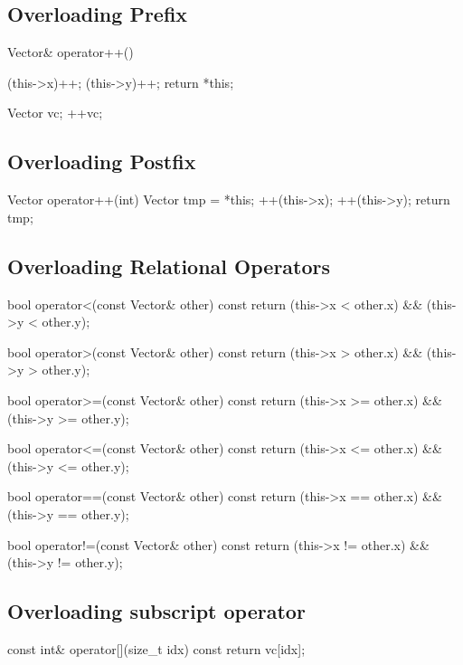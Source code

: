 \documentclass{report}
\begin{document}
    \bigbreak \noindent 
    \subsection{Overloading Prefix}
    \bigbreak \noindent 
    \begin{cppcode}
     Vector& operator++() {
            (this->x)++;
            (this->y)++;
            return *this;

    }
    Vector vc;
    ++vc;
    \end{cppcode}

    \bigbreak \noindent 
    \subsection{Overloading Postfix}
    \bigbreak \noindent 
    \begin{cppcode}
    Vector operator++(int) {
            Vector tmp = *this;
            ++(this->x);
            ++(this->y);
            return  tmp;
    }
    \end{cppcode}
    \bigbreak \noindent 

    \pagebreak
    \subsection{Overloading Relational Operators}
    \bigbreak \noindent 
    \begin{cppcode}
    bool operator<(const Vector& other) const {
        return (this->x < other.x) && (this->y < other.y);
    }

    bool operator>(const Vector& other) const {
        return (this->x > other.x) && (this->y > other.y);
    }

    bool operator>=(const Vector& other) const {
        return (this->x >= other.x) && (this->y >= other.y);
    }

    bool operator<=(const Vector& other) const {
        return (this->x <= other.x) && (this->y <= other.y);
    }

    bool operator==(const Vector& other) const {
        return (this->x == other.x) && (this->y == other.y);
    }

    bool operator!=(const Vector& other) const {
        return (this->x != other.x) && (this->y != other.y);
    }
    \end{cppcode}

    \bigbreak \noindent 
    \subsection{Overloading subscript operator}
    \bigbreak \noindent 
    \begin{cppcode}
    const int& operator[](size_t idx) const {
        return vc[idx];
    }
    \end{cppcode}
\end{document}
